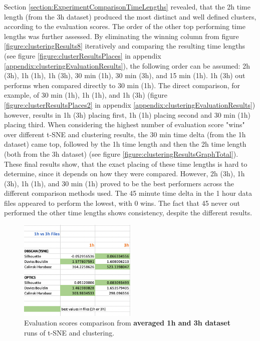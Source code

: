 Section \ref{section:ExperimentComparisonTimeLengths} revealed, that the 2h time length (from the 3h dataset) produced the most distinct and well defined clusters, according to the evaluation scores. The order of the other top performing time lengths was further assessed. By eliminating the winning column from figure \ref{figure:clusteringResults8} iteratively and comparing the resulting time lengths (see figure \ref{figure:clusterResultsPlaces} in appendix \ref{appendix:clusteringEvaluationResults}), the following order can be assumed: 2h (3h), 1h (1h), 1h (3h), 30 min (1h), 30 min (3h), and 15 min (1h). 1h (3h) out performs when compared directly to 30 min (1h). The direct comparison, for example, of 30 min (1h), 1h (1h), and 1h (3h) (figure \ref{figure:clusterResultsPlaces2} in appendix \ref{appendix:clusteringEvaluationResults}) however, results in 1h (3h) placing first, 1h (1h) placing second and 30 min (1h) placing third. When considering the highest number of evaluation score "wins" over different t-SNE and clustering results, the 30 min time delta (from the 1h dataset) came top, followed by the 1h time length and then the 2h time length (both from the 3h dataset) (see figure \ref{figure:clusteringResultsGraphTotal}). These final results show, that the exact placing of these time lengths is hard to determine, since it depends on how they were compared. However, 2h (3h), 1h (3h), 1h (1h), and 30 min (1h) proved to be the best performers across the different comparison methods used.
The 45 minute time delta in the 1 hour data files appeared to perform the lowest, with 0 wins. The fact that 45 never out performed the other time lengths shows consistency, despite the different results.
 


\begin{figure}
  \centering
  \includegraphics[width=0.5\textwidth]{./images/clusteringResults/clusteringResults7.png}
  \caption{Evaluation scores comparison from \textbf{averaged 1h and 3h dataset} runs of t-SNE and clustering.}
  \label{figure:clusteringResults7}
\end{figure}


